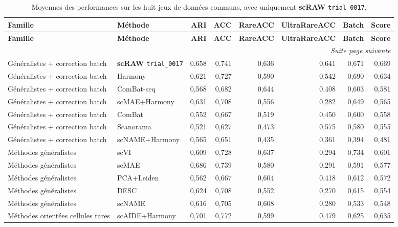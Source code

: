 {\scriptsize
\setlength{\tabcolsep}{3pt}
\renewcommand{\arraystretch}{1.12}
\begin{longtable}{p{}p{}rrrrrr}
\caption{Moyennes des performances sur les huit jeux de données communs, avec uniquement \textbf{scRAW} \texttt{trial\_0017}.}\label{tab:common8_all_methods_means}\\
\toprule
\textbf{Famille} & \textbf{Méthode} & \textbf{ARI} & \textbf{ACC} & \textbf{RareACC} & \textbf{UltraRareACC} & \textbf{Batch} & \textbf{Score} \\
\midrule
\endfirsthead
\toprule
\textbf{Famille} & \textbf{Méthode} & \textbf{ARI} & \textbf{ACC} & \textbf{RareACC} & \textbf{UltraRareACC} & \textbf{Batch} & \textbf{Score} \\
\midrule
\endhead
\midrule
\multicolumn{8}{r}{\textit{Suite page suivante}}\\
\endfoot
\bottomrule
\endlastfoot
Généralistes + correction batch & \textbf{scRAW} \texttt{trial\_0017} & 0,658 & 0,741 & 0,636 & 0,641 & 0,671 & 0,669 \\
Généralistes + correction batch & Harmony & 0,621 & 0,727 & 0,590 & 0,542 & 0,690 & 0,634 \\
Généralistes + correction batch & ComBat-seq & 0,568 & 0,682 & 0,644 & 0,408 & 0,603 & 0,581 \\
Généralistes + correction batch & scMAE+Harmony & 0,631 & 0,708 & 0,556 & 0,282 & 0,649 & 0,565 \\
Généralistes + correction batch & ComBat & 0,552 & 0,667 & 0,519 & 0,450 & 0,600 & 0,558 \\
Généralistes + correction batch & Scanorama & 0,521 & 0,627 & 0,473 & 0,575 & 0,580 & 0,555 \\
Généralistes + correction batch & scNAME+Harmony & 0,565 & 0,651 & 0,435 & 0,361 & 0,394 & 0,481 \\
Méthodes généralistes & scVI & 0,609 & 0,728 & 0,637 & 0,294 & 0,734 & 0,601 \\
Méthodes généralistes & scMAE & 0,686 & 0,739 & 0,580 & 0,291 & 0,591 & 0,577 \\
Méthodes généralistes & PCA+Leiden & 0,562 & 0,667 & 0,604 & 0,418 & 0,612 & 0,572 \\
Méthodes généralistes & DESC & 0,624 & 0,708 & 0,552 & 0,270 & 0,615 & 0,554 \\
Méthodes généralistes & scNAME & 0,616 & 0,705 & 0,608 & 0,280 & 0,533 & 0,548 \\
Méthodes orientées cellules rares & scAIDE+Harmony & 0,701 & 0,772 & 0,599 & 0,479 & 0,625 & 0,635 \\

\end{longtable}}
